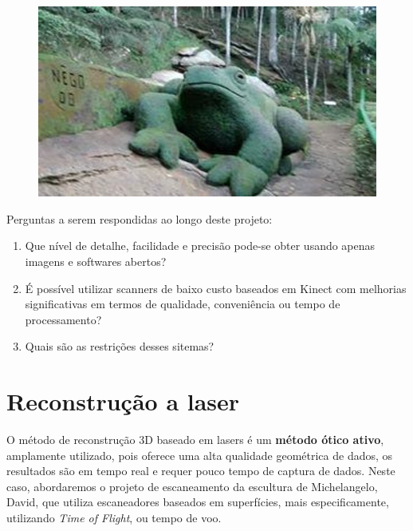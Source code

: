 \documentclass[table, usenames, svgnames, xcolor=dvipsnames]{beamer}
\begin{document}
\begin{frame} 
	\begin{figure}[!h]
		\centering
		\includegraphics[width=0.7\linewidth]{figs/jardim-do-nego32.jpg}
	\end{figure}
\end{frame}

\begin{frame}

Perguntas a serem respondidas ao longo deste projeto:

	\begin{enumerate}
	\item {Que nível de detalhe, facilidade e precisão pode-se obter usando apenas imagens e softwares abertos?}
	\item {É possível utilizar scanners de baixo custo baseados em Kinect com melhorias significativas em termos de qualidade, conveniência ou tempo de processamento?}
	\item {Quais são as restrições desses sitemas?}
	\end{enumerate}
	
\end{frame}

\section{Reconstrução a laser}

\begin{frame} 
	\begin{center}
    O método de reconstrução 3D baseado em lasers é um \textbf{método ótico ativo}, amplamente utilizado, pois oferece uma alta qualidade geométrica de dados, os resultados são em tempo real e requer pouco tempo de captura de dados.
Neste caso, abordaremos o projeto de escaneamento da escultura de Michelangelo, David, que utiliza escaneadores baseados em superfícies, mais especificamente, utilizando \emph{Time of Flight}, ou tempo de voo.
	\end{center}
\end{frame}
\end{document}

